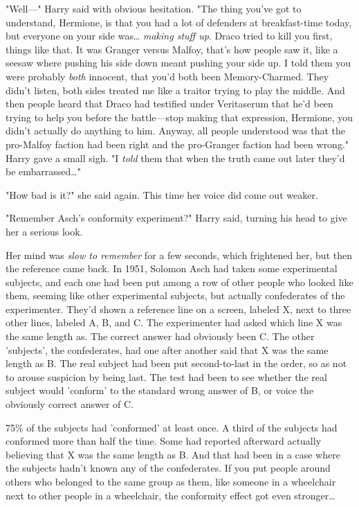 "Well---" Harry said with obvious hesitation. "The thing you've got to 
understand, Hermione, is that you had a lot of defenders at breakfast-time 
today, but everyone on your side was{\ldots} \emph{making stuff up}. Draco 
tried to kill you first, things like that. It was Granger versus Malfoy, that's 
how people saw it, like a seesaw where pushing his side down meant pushing your 
side up. I told them you were probably \emph{both} innocent, that you'd both 
been Memory-Charmed. They didn't listen, both sides treated me like a traitor 
trying to play the middle. And then people heard that Draco had testified under 
Veritaserum that he'd been trying to help you before the battle---stop making 
that expression, Hermione, you didn't actually do anything to him. Anyway, all 
people understood was that the pro-Malfoy faction had been right and the 
pro-Granger faction had been wrong." Harry gave a small sigh. "I \emph{told} 
them that when the truth came out later they'd be embarrassed{\ldots}"

"How bad is it?" she said again. This time her voice did come out weaker.

"Remember Asch's conformity experiment?" Harry said, turning his head to give 
her a serious look.

Her mind was \emph{slow to remember} for a few seconds, which frightened her, 
but then the reference came back. In 1951, Solomon Asch had taken some 
experimental subjects, and each one had been put among a row of other people 
who looked like them, seeming like other experimental subjects, but actually 
confederates of the experimenter. They'd shown a reference line on a screen, 
labeled X, next to three other lines, labeled A, B, and C. The experimenter had 
asked which line X was the same length as. The correct answer had obviously 
been C. The other 'subjects', the confederates, had one after another said that 
X was the same length as B. The real subject had been put second-to-last in the 
order, so as not to arouse suspicion by being last. The test had been to see 
whether the real subject would 'conform' to the standard wrong answer of B, or 
voice the obviously correct answer of C.

75\% of the subjects had 'conformed' at least once. A third of the subjects had 
conformed more than half the time. Some had reported afterward actually 
believing that X was the same length as B. And that had been in a case where 
the subjects hadn't known any of the confederates. If you put people around 
others who belonged to the same group as them, like someone in a wheelchair 
next to other people in a wheelchair, the conformity effect got even 
stronger{\ldots}

